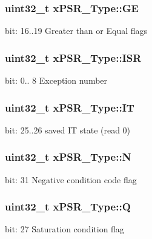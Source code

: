 \subsubsection[{\texorpdfstring{GE}{GE}}]{\setlength{\rightskip}{0pt plus 5cm}uint32\+\_\+t x\+P\+S\+R\+\_\+\+Type\+::\+GE}\hypertarget{unionx_p_s_r___type_a2d0ec4ccae337c1df5658f8cf4632e76}{}\label{unionx_p_s_r___type_a2d0ec4ccae337c1df5658f8cf4632e76}
bit\+: 16..19 Greater than or Equal flags 
\subsubsection[{\texorpdfstring{I\+SR}{ISR}}]{\setlength{\rightskip}{0pt plus 5cm}uint32\+\_\+t x\+P\+S\+R\+\_\+\+Type\+::\+I\+SR}\hypertarget{unionx_p_s_r___type_a3e9120dcf1a829fc8d2302b4d0673970}{}\label{unionx_p_s_r___type_a3e9120dcf1a829fc8d2302b4d0673970}
bit\+: 0.. 8 Exception number 
\subsubsection[{\texorpdfstring{IT}{IT}}]{\setlength{\rightskip}{0pt plus 5cm}uint32\+\_\+t x\+P\+S\+R\+\_\+\+Type\+::\+IT}\hypertarget{unionx_p_s_r___type_a3200966922a194d84425e2807a7f1328}{}\label{unionx_p_s_r___type_a3200966922a194d84425e2807a7f1328}
bit\+: 25..26 saved IT state (read 0) 
\subsubsection[{\texorpdfstring{N}{N}}]{\setlength{\rightskip}{0pt plus 5cm}uint32\+\_\+t x\+P\+S\+R\+\_\+\+Type\+::N}\hypertarget{unionx_p_s_r___type_a2db9a52f6d42809627d1a7a607c5dbc5}{}\label{unionx_p_s_r___type_a2db9a52f6d42809627d1a7a607c5dbc5}
bit\+: 31 Negative condition code flag 
\subsubsection[{\texorpdfstring{Q}{Q}}]{\setlength{\rightskip}{0pt plus 5cm}uint32\+\_\+t x\+P\+S\+R\+\_\+\+Type\+::Q}\hypertarget{unionx_p_s_r___type_add7cbd2b0abd8954d62cd7831796ac7c}{}\label{unionx_p_s_r___type_add7cbd2b0abd8954d62cd7831796ac7c}
bit\+: 27 Saturation condition flag 
